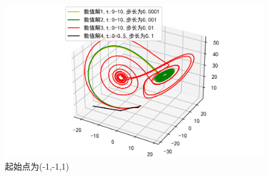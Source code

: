 \documentclass[a4paper]{article}%
\begin{document}
\begin{figure}[H]
    \centering
    \includegraphics[scale=0.8]{55}
    \caption{起始点为(-1,-1,1)}
\end{figure}
\end{document}
